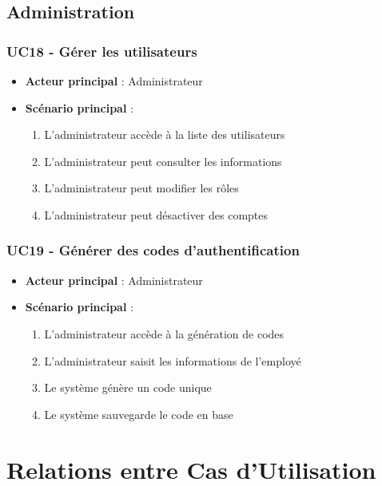 \documentclass[12pt,a4paper]{article}
\begin{document}
\subsection{Administration}

\subsubsection{UC18 - Gérer les utilisateurs}
\begin{itemize}
    \item \textbf{Acteur principal} : Administrateur
    \item \textbf{Scénario principal} :
    \begin{enumerate}
        \item L'administrateur accède à la liste des utilisateurs
        \item L'administrateur peut consulter les informations
        \item L'administrateur peut modifier les rôles
        \item L'administrateur peut désactiver des comptes
    \end{enumerate}
\end{itemize}

\subsubsection{UC19 - Générer des codes d'authentification}
\begin{itemize}
    \item \textbf{Acteur principal} : Administrateur
    \item \textbf{Scénario principal} :
    \begin{enumerate}
        \item L'administrateur accède à la génération de codes
        \item L'administrateur saisit les informations de l'employé
        \item Le système génère un code unique
        \item Le système sauvegarde le code en base
    \end{enumerate}
\end{itemize}

\section{Relations entre Cas d'Utilisation}
\end{document}
